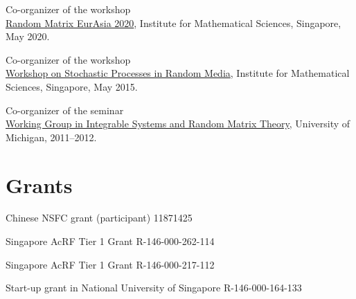 \begin{item_list}
\item Co-organizer of the workshop  \\
  \href{https://ims.nus.edu.sg/events/2020/random/index.php}{Random Matrix EurAsia 2020}, Institute for Mathematical Sciences, Singapore, May 2020.
\item Co-organizer of the workshop  \\
  \href{http://www2.ims.nus.edu.sg/Programs/015wrandom/index.php}{Workshop on Stochastic Processes in Random Media}, Institute for Mathematical Sciences, Singapore, May 2015.
\item Co-organizer of the seminar  \\
  \href{http://www.math.lsa.umich.edu/seminars_events/events.php?eventdefid=43&dt_begin=2011-07-01&dt_end=2011-12-31}
  {Working Group in Integrable Systems and Random Matrix Theory}, University of Michigan, 2011--2012.
\end{item_list}

\section*{Grants }

\begin{item_list}
\item 
  Chinese NSFC grant (participant) 
  11871425
\item
  Singapore AcRF Tier 1 Grant 
  R-146-000-262-114
\item
  Singapore AcRF Tier 1 Grant 
  R-146-000-217-112
\item
  Start-up grant in National University of Singapore 
  R-146-000-164-133
  
\end{item_list}

